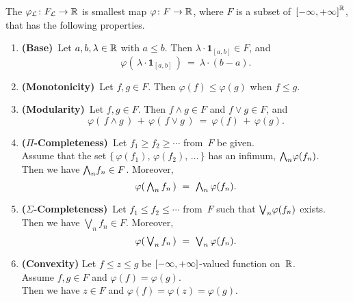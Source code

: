 \documentclass[main.tex]{subfiles}
\begin{document}
\begin{dfn}
\label{D:lebesgue-integral}
The 
$\varphi_{\mathcal{L}} \colon F_{\mathcal{L}} \rightarrow \mathbb{R}$
is smallest map $\varphi\colon F \rightarrow \mathbb{R}$,
where $F$ is a subset of~${[-\infty,+\infty]}^{\mathbb{R}}$,
that has the following properties.
\begin{enumerate}
\item
\label{prop:integral-1}
\textbf{(Base)}\ 
Let $a,b,\lambda\in\mathbb{R}$ with $a\leq b$. 
Then $\lambda\cdot\mathbf{1}_{[a,b]}\in F$,
and
\begin{equation*}
\varphi(\,\lambda\cdot \mathbf{1}_{[a,b]}\,)\ =\ \lambda\cdot(b-a).
\end{equation*}

\item
\label{prop:integral-2}
\textbf{(Monotonicity)}\ 
Let $f,g\in F$.
Then $\varphi(f)\leq \varphi(g)$
when  $f\leq g$.

\item
\label{prop:integral-3}
\textbf{(Modularity)}\ 
Let $f,g\in F$.
Then $f\wedge g\in F$ and $f \vee g \in F$, and
\begin{equation*}
\varphi(\,f\wedge g\,)\,+\,\varphi(\,f\vee g\,)\ =\ \varphi(f)\,+\,\varphi(g).
\end{equation*}

\item
\label{prop:integral-4}
\textbf{($\Pi$-Completeness)}\ 
Let $f_1 \geq f_2 \geq \dotsb$
from~$F$ be given.\\
Assume that the set $\{\,\varphi(f_1),\, \varphi(f_2),\, \dotsc\,\}$
has an infimum, $\textstyle{\bigwedge}_n \varphi(f_n)$.\\
Then we have $\textstyle{\bigwedge}_n f_n \in F$.
Moreover,
\begin{equation*}
\varphi(\, \textstyle{ \bigwedge_n f_n }\,) \ =\ \textstyle{\bigwedge}_n \,\varphi(f_n).
\end{equation*}

\item
\label{prop:integral-5}
\textbf{($\Sigma$-Completeness)}\ 
Let $f_1 \leq f_2 \leq \dotsb$
from~$F$ 
such that $\textstyle{\bigvee}_n \varphi(f_n)$ exists.\\
Then we have $\bigvee_n f_n \in F$.
Moreover,
\begin{equation*}
\varphi(\, \textstyle{ \bigvee_n f_n }\,) \ =\ \textstyle{\bigvee}_n \,\varphi(f_n).
\end{equation*}

\item
\label{prop:integral-6}
\textbf{(Convexity)}
Let $f\leq z \leq g$ be ${[-\infty,+\infty]}$-valued function on~$\mathbb{R}$.\\
Assume $f,g\in F$ and $\varphi(f)=\varphi(g)$.\\
Then we have $z\in F$ and $\varphi(f) = \varphi(z)= \varphi(g)$.
\end{enumerate}
\end{dfn}
\end{document}
